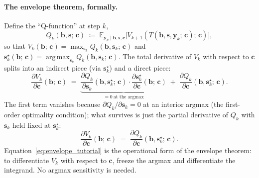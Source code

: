 \documentclass[11pt]{article}
\newcommand{\bc}{\bm{c}}
\newcommand{\by}{\bm{y}}
\newcommand{\bs}{\bm{s}}
\newcommand{\bb}{\bm{b}}
\newcommand{\E}{\mathbb{E}}
\newcommand{\argmax}{\operatorname*{arg\,max}}
\begin{document}
\paragraph{The envelope theorem, formally.}  Define the ``Q-function'' at step $k$,
\begin{equation}
Q_k(\bb, \bs;\, \bc) \;\coloneqq\; \E_{\by_k \mid \bb, \bs, \bc}\!\bigl[V_{k+1}(T(\bb, \bs, \by_k;\, \bc);\, \bc)\bigr],
\label{eq:Q_def}
\end{equation}
so that $V_k(\bb;\, \bc) = \max_{\bs_k} Q_k(\bb, \bs_k;\, \bc)$ and $\bs_k^\star(\bb;\, \bc) = \argmax_{\bs_k} Q_k(\bb, \bs_k;\, \bc)$.  The total derivative of $V_k$ with respect to $\bc$ splits into an indirect piece (via $\bs_k^\star$) and a direct piece:
\begin{equation}
\frac{\partial V_k}{\partial \bc}(\bb;\, \bc)
\;=\; \underbrace{\frac{\partial Q_k}{\partial \bs_k}(\bb, \bs_k^\star;\, \bc) \cdot \frac{\partial \bs_k^\star}{\partial \bc}(\bb;\, \bc)}_{= 0 \ \text{at the argmax}}
\;+\; \frac{\partial Q_k}{\partial \bc}(\bb, \bs_k^\star;\, \bc).
\end{equation}
The first term vanishes because $\partial Q_k / \partial \bs_k = 0$ at an interior argmax (the first-order optimality condition); what survives is just the partial derivative of $Q_k$ with $\bs_k$ held fixed at $\bs_k^\star$:
\begin{equation}
\boxed{\ \frac{\partial V_k}{\partial \bc}(\bb;\, \bc) \;=\; \frac{\partial Q_k}{\partial \bc}(\bb, \bs_k^\star;\, \bc).\ }
\label{eq:envelope_tutorial}
\end{equation}
Equation~\eqref{eq:envelope_tutorial} is the operational form of the envelope theorem: to differentiate $V_k$ with respect to $\bc$, freeze the argmax and differentiate the integrand.  No argmax sensitivity is needed.
\end{document}
